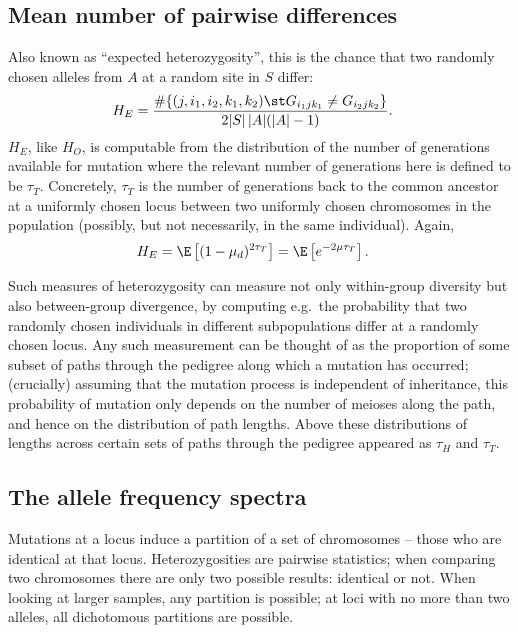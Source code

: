 \subsection{Mean number of pairwise differences}

Also known as ``expected heterozygosity'',
this is the chance that two randomly chosen alleles from $A$ at a random site in $S$ differ:
\begin{align}
  H_E &= \frac{ \#\{ (j,i_1,i_2,k_1,k_2) \st G_{i_1jk_1} \neq G_{i_2jk_2}  \} }{2|S|\,|A|(|A|-1)}  .
\end{align}
$H_E$, like $H_O$, is computable from the distribution of the number of generations available for mutation 
where the relevant number of generations here is defined to be $\tau_T$.
Concretely, $\tau_T$ is the number of generations back to the common ancestor
at a uniformly chosen locus
between two uniformly chosen chromosomes in the population
(possibly, but not necessarily, in the same individual).
Again,
\begin{align}
  H_E &= \E\left[ (1-\mu_d)^{2 \tau_T} \right] = \E\left[ e^{-2 \mu \tau_T} \right] .
\end{align}


Such measures of heterozygosity can measure not only within-group diversity
but also between-group divergence,
by computing e.g.\ the probability that two randomly chosen individuals
in different subpopulations
differ at a randomly chosen locus.
Any such measurement can be thought of as the proportion
of some subset of paths through the pedigree
along which a mutation has occurred;
(crucially) assuming that the mutation process is independent of inheritance,
this probability of mutation only depends on the number of meioses along the path,
and hence on the distribution of path lengths.
Above these distributions of lengths across certain sets of paths through the pedigree
appeared as $\tau_H$ and $\tau_T$.



\subsection{The allele frequency spectra}

Mutations at a locus induce a partition of a set of chromosomes --
those who are identical at that locus.
Heterozygosities are pairwise statistics;
when comparing two chromosomes there are only two possible results:
identical or not.
When looking at larger samples, any partition is possible;
at loci with no more than two alleles, all dichotomous partitions are possible.

